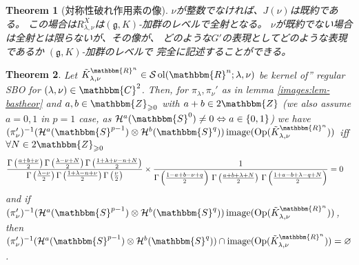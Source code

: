 \documentclass[12pt]{msjproc} %
\newcommand{\tmop}[1]{\ensuremath{\operatorname{#1}}}
\newtheorem{theorem}{Theorem}
\theoremstyle{definition}
\theoremstyle{exampstyle} \newtheorem{examp}[theorem]{Theorem}
\begin{document}
\begin{theorem}[対称性破れ作用素の像]
	$\nu$が整数でなければ、$J(\nu)$は既約である。
	この場合は$R_{\lambda,\nu}^X$は$(\mathfrak{g},K)$-加群のレベルで全射となる。
	$\nu$が既約でない場合は全射とは限らないが、その像が、
	どのような$G'$の表現としてどのような表現であるか $(\mathfrak{g},K)$-加群のレベルで
	完全に記述することができる。
\end{theorem}
\begin{versiona}
	
\begin{theorem}
  \label{images:prop-criterion}Let $\tilde{K}_{\lambda, \nu}^{\mathbbm{R}^n}
  \in \mathcal{S} \tmop{ol} (\mathbbm{R}^n ; \lambda, \nu)$ be kernel of''
  regular SBO for $(\lambda, \nu) \in \mathbbm{C}^2$. Then, for
  $\pi_{\lambda}, \pi_{\nu}'$ as in lemma \ref{images:lem-bastheor} and $a, b
  \in \mathbbm{Z}_{\geqslant 0}$ with $a + b \in 2\mathbbm{Z}$ (we also assume
  $a = 0, 1$ in $p = 1$ case, as $\mathcal{H}^a (\mathbbm{S}^0) \neq 0
  \Leftrightarrow a \in \{ 0, 1 \}$) we have $(\pi_{\nu}')^{- 1}
  (\mathcal{H}^a (\mathbbm{S}^{p - 1}) \otimes \mathcal{H}^b (\mathbbm{S}^q))
  \tmop{image} (\tmop{Op} (\tilde{K}_{\lambda, \nu}^{\mathbbm{R}^n}))$ iff
  $\forall N \in 2\mathbbm{Z}_{\geqslant 0}$
  \begin{eqnarray}
    & \frac{\Gamma \left( \frac{a + b + \nu}{2} \right) \Gamma \left(
    \frac{\lambda - \nu + N}{2} \right) \Gamma \left( \frac{1 + \lambda + \nu
    - n + N}{2} \right)}{\Gamma \left( \frac{\lambda - \nu}{2} \right) \Gamma
    \left( \frac{1 + \lambda - n + \nu}{2} \right) \Gamma \left( \frac{\nu}{2}
    \right)} \times \frac{1}{\Gamma \left( \frac{1 - a + b - \nu + q}{2}
    \right)  \hspace{0.17em} \Gamma \left( \frac{a + b + \lambda + N}{2}
    \right)  \hspace{0.17em} \Gamma \left( \frac{1 + a - b + \lambda - q +
    N}{2} \right)} = 0 &  \nonumber
  \end{eqnarray}
  and if $(\pi_{\nu}')^{- 1} (\mathcal{H}^a (\mathbbm{S}^{p - 1}) \otimes
  \mathcal{H}^b (\mathbbm{S}^q)) \tmop{image} (\tmop{Op} (\tilde{K}_{\lambda,
  \nu}^{\mathbbm{R}^n}))$, then $(\pi_{\nu}')^{- 1} (\mathcal{H}^a
  (\mathbbm{S}^{p - 1}) \otimes \mathcal{H}^b (\mathbbm{S}^q)) \cap
  \tmop{image} (\tmop{Op} (\tilde{K}_{\lambda, \nu}^{\mathbbm{R}^n})) =
  \varnothing$.
\end{theorem}


\end{versiona}
\end{document}
